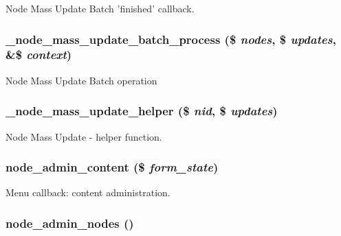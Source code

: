 Node Mass Update Batch 'finished' callback. \hypertarget{node_8admin_8inc_5960eac661f3d304ee9861fa25c53d80}{
\subsubsection[{\_\-node\_\-mass\_\-update\_\-batch\_\-process}]{\setlength{\rightskip}{0pt plus 5cm}\_\-node\_\-mass\_\-update\_\-batch\_\-process (\$ {\em nodes}, \/  \$ {\em updates}, \/  \&\$ {\em context})}}
\label{node_8admin_8inc_5960eac661f3d304ee9861fa25c53d80}


Node Mass Update Batch operation \hypertarget{node_8admin_8inc_664540e1e689d8cdd4850bb7cb498a09}{
\subsubsection[{\_\-node\_\-mass\_\-update\_\-helper}]{\setlength{\rightskip}{0pt plus 5cm}\_\-node\_\-mass\_\-update\_\-helper (\$ {\em nid}, \/  \$ {\em updates})}}
\label{node_8admin_8inc_664540e1e689d8cdd4850bb7cb498a09}


Node Mass Update - helper function. \hypertarget{node_8admin_8inc_267ebd4df592a90d86949c10ad1cae2c}{
\subsubsection[{node\_\-admin\_\-content}]{\setlength{\rightskip}{0pt plus 5cm}node\_\-admin\_\-content (\$ {\em form\_\-state})}}
\label{node_8admin_8inc_267ebd4df592a90d86949c10ad1cae2c}


Menu callback: content administration. \hypertarget{node_8admin_8inc_3fb56c702a3c16eddd2fcd8ccd3e4adb}{
\subsubsection[{node\_\-admin\_\-nodes}]{\setlength{\rightskip}{0pt plus 5cm}node\_\-admin\_\-nodes ()}}
\label{node_8admin_8inc_3fb56c702a3c16eddd2fcd8ccd3e4adb}


